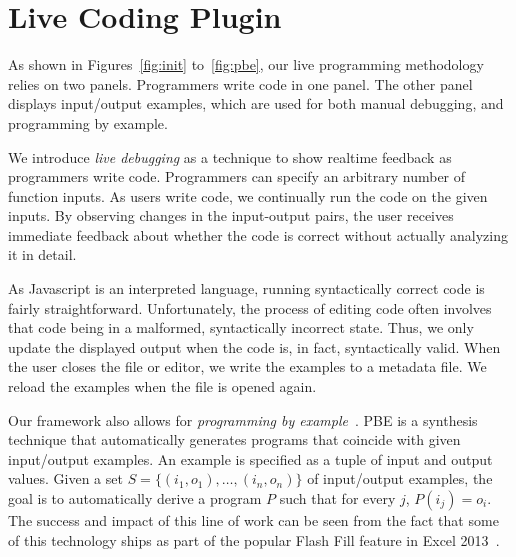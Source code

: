 \vspace{-8pt}
\section{Live Coding Plugin}
As shown in Figures~\ref{fig:init} to~\ref{fig:pbe}, our live programming methodology
relies on two panels.
Programmers write code in one panel.
The other panel displays input/output examples,
which are used for both manual debugging,
and programming by example.

We introduce \textit{live debugging} as a technique to show realtime feedback as programmers write code.
Programmers can specify an arbitrary number of function inputs.
As users write code, we continually run the code on the given inputs. By observing changes in the input-output pairs,
the user receives immediate feedback about whether the code is correct without actually analyzing it in detail.

As Javascript is an interpreted language, running syntactically correct code is fairly straightforward.
Unfortunately, the process of editing code often involves that code
being in a malformed, syntactically incorrect state.
Thus, we only update the displayed output when the code is, in fact,
syntactically valid.
When the user closes the file or editor,
we write the examples to a metadata file.
We reload the examples when the file is opened again.

Our framework also allows for \textit{programming by example}~\cite{cypher1991eager,cypher93,lieberman01,synasc12}.
PBE  is a synthesis technique that automatically generates programs that coincide with given input/output examples. An example is specified as a tuple of input and output values. Given a set $S= \{(i_1, o_1),\ldots, (i_n, o_n)\}$ of input/output examples, the goal is to automatically derive a program $P$ such that for every $j$, $P(i_j) = o_i$. The success and impact of this line of work can be seen from the fact that some of this technology ships as part of the popular Flash Fill feature in Excel 2013~\cite{flashFillPOPL}.

